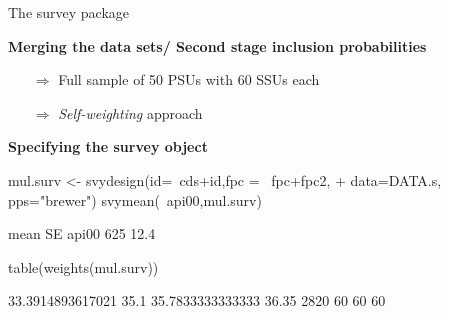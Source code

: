 \documentclass[11pt,german,hideothersubsections]{beamer}
\begin{document}
\begin{frame}[fragile]{The survey package}
\vspace{-.25cm}
\footnotesize{
\begin{center}
\textbf{Merging the data sets/ Second stage inclusion probabilities}
\end{center}

\begin{Schunk}
\end{Schunk}

\begin{itemize}
\item[$\Rightarrow$] Full sample of 50 PSUs with 60 SSUs each
\item[$\Rightarrow$] \emph{Self-weighting} approach
\end{itemize}

\pause\begin{center}
\textbf{Specifying the survey object}
\end{center}

\begin{Schunk}
\begin{Sinput}
 mul.surv <- svydesign(id=~cds+id,fpc = ~fpc+fpc2,
+                       data=DATA.s, pps="brewer")
 svymean(~api00,mul.surv)
\end{Sinput}
\begin{Soutput}
      mean   SE
api00  625 12.4
\end{Soutput}
\begin{Sinput}
 table(weights(mul.surv))
\end{Sinput}
\begin{Soutput}
33.3914893617021             35.1 35.7833333333333            36.35 
            2820               60               60               60 
\end{Soutput}
\end{Schunk}

}
\end{frame}
\end{document}
